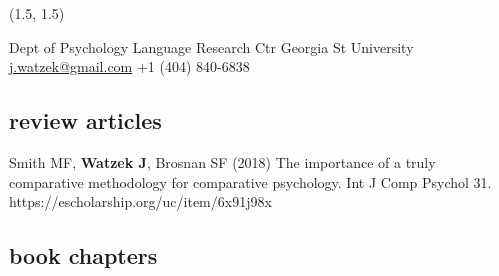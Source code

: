 \documentclass[]{friggeri-cv}
\begin{document}

\pagestyle{fancy}

\renewenvironment{aside}{%
  \let\oldsection\section
  \renewcommand{\section}[1]{
    \par\vspace{\baselineskip}{\Large\headingfont\color{headercolor} ##1}
  }
  \begin{textblock}{3.6}(1.5, 1.5)
  \begin{flushright}
  \obeycr
}{%
  \restorecr
  \end{flushright}
  \end{textblock}
  \let\section\oldsection
}


\begin{aside}
  \section{{\normalfont julia}watzek}
    Dept of Psychology
    Language Research Ctr
    Georgia St University
    ~
    \href{mailto:j.watzek@gmail.com}{j.watzek@gmail.com}
    +1 (404) 840-6838
\end{aside}


\subsection{review articles}

\begin{enumerate}[resume, label={[\,\arabic*\,]}]
  \item Smith MF, \textbf{Watzek J}, Brosnan SF (2018) The importance of a truly comparative methodology for comparative psychology. Int J Comp Psychol 31. https://escholarship.org/uc/item/6x91j98x
\end{enumerate}


\subsection{book chapters}
\end{document}
